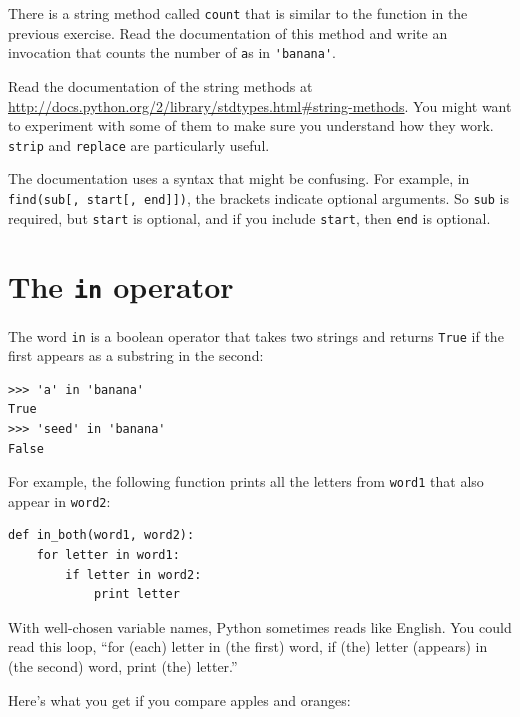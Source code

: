 \documentclass[10pt]{book}
\begin{document}
\begin{exercise}

There is a string method called {\tt count} that is similar
to the function in the previous exercise.  Read the documentation
of this method
and write an invocation that counts the number of {\tt a}s
in \verb"'banana'".
\end{exercise}


\begin{exercise}

Read the documentation of the string methods at
\url{http://docs.python.org/2/library/stdtypes.html#string-methods}.
You might want to experiment with some of them to make sure you
understand how they work.  {\tt strip} and {\tt replace} are
particularly useful.

The documentation uses a syntax that might be confusing.
For example, in \verb"find(sub[, start[, end]])", the brackets
indicate optional arguments.  So {\tt sub} is required, but
{\tt start} is optional, and if you include {\tt start},
then {\tt end} is optional.
\end{exercise}


\section{The {\tt in} operator}
\label{inboth}

The word {\tt in} is a boolean operator that takes two strings and
returns {\tt True} if the first appears as a substring in the second:

\begin{verbatim}
>>> 'a' in 'banana'
True
>>> 'seed' in 'banana'
False
\end{verbatim}
%
For example, the following function prints all the
letters from {\tt word1} that also appear in {\tt word2}:

\begin{verbatim}
def in_both(word1, word2):
    for letter in word1:
        if letter in word2:
            print letter
\end{verbatim}
%
With well-chosen variable names,
Python sometimes reads like English.  You could read
this loop, ``for (each) letter in (the first) word, if (the) letter 
(appears) in (the second) word, print (the) letter.''

Here's what you get if you compare apples and oranges:
\end{document}
